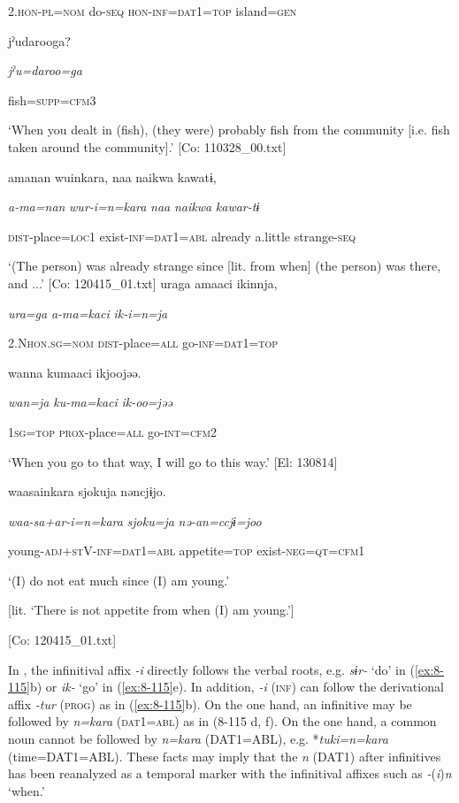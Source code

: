       2.\textsc{hon}-\textsc{pl}=\textsc{nom}  do-\textsc{seq}  \textsc{hon}-\textsc{inf}=\textsc{dat}1=\textsc{top}  island=\textsc{gen}

      jˀudarooga?

      \textit{jˀu=daroo=ga}

      fish=\textsc{supp}=\textsc{cfm}3

\glt ‘When you dealt in (fish), (they were) probably fish from the community [i.e. fish taken around the community].’ [Co: 110328\_00.txt]
\ex [= \REF{ex:6-56}]

    {\TM}
\glll  amanan  wuinkara,  naa  naikwa  kawatɨ,

      \textit{a-ma=nan}  \textit{wur-i=n=kara}  \textit{naa}  \textit{naikwa}  \textit{kawar-tɨ}

      \textsc{dist}-place=\textsc{loc}1  exist-\textsc{inf}=\textsc{dat}1=\textsc{abl}  already  a.little  strange-\textsc{seq}

\glt ‘(The person) was already strange since [lit. from when] (the person) was there, and ...’ [Co: 120415\_01.txt]
\ex {\TM}
\glll  uraga  amaaci  ikinnja,

      \textit{ura=ga}  \textit{a-ma=kaci}  \textit{ik-i=n=ja}

      2.N\textsc{hon}.\textsc{sg}=\textsc{nom}  \textsc{dist}-place=\textsc{all}  go-\textsc{inf}=\textsc{dat}1=\textsc{top}

      wanna  kumaaci  ikjoojəə.

      \textit{wan=ja}  \textit{ku-ma=kaci}  \textit{ik-oo=jəə}

      1\textsc{sg}=\textsc{top}  \textsc{prox}-place=\textsc{all}  go-\textsc{int}=\textsc{cfm}2

\glt ‘When you go to that way, I will go to this way.’ [El: 130814]

\ex {\TM}
\glll  waasainkara  {\textbar}sjoku{\textbar}ja  nəncjɨjo.

      \textit{waa-sa+ar-i=n=kara}  \textit{sjoku=ja}  \textit{nə-an=ccjɨ=joo}

      young-\textsc{adj}+\textsc{st}V-\textsc{inf}=\textsc{dat}1=\textsc{abl}  appetite=\textsc{top}  exist-\textsc{neg}=\textsc{qt}=\textsc{cfm1}

\glt ‘(I) do not eat much since (I) am young.’

[lit. ‘There is not appetite from when (I) am young.’]

      [Co: 120415\_01.txt]
\z

In , the infinitival affix \textit{{}-i} directly follows the verbal roots, e.g. \textit{sɨr-} ‘do’ in (\ref{ex:8-115}b) or \textit{ik-} ‘go’ in (\ref{ex:8-115}e). In addition, \textit{{}-i} (\textsc{inf}) can follow the derivational affix \textit{{}-tur} (\textsc{prog}) as in (\ref{ex:8-115}b). On the one hand, an infinitive may be followed by \textit{n=kara} (\textsc{dat}1=\textsc{abl}) as in (8-115 d, f). On the one hand, a common noun cannot be followed by \textit{n=kara} (DAT1=ABL), e.g. *\textit{tuki=n=kara} (time=DAT1=ABL). These facts may imply that the \textit{n} (DAT1) after infinitives has been reanalyzed as a temporal marker with the infinitival affixes such as \textit{-}(\textit{i})\textit{n} ‘when.’

